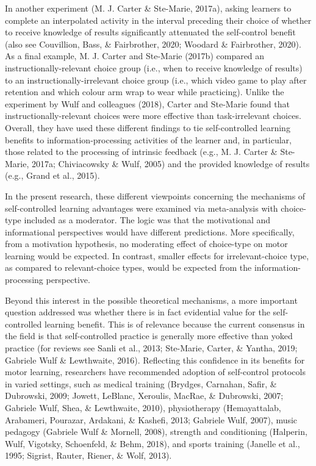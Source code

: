 \documentclass[
  english,
  man, donotrepeattitle,floatsintext]{apa7}
\begin{document}
In another experiment (M. J. Carter \& Ste-Marie, 2017a), asking learners to complete an interpolated activity in the interval preceding their choice of whether to receive knowledge of results significantly attenuated the self-control benefit (also see Couvillion, Bass, \& Fairbrother, 2020; Woodard \& Fairbrother, 2020). As a final example, M. J. Carter and Ste-Marie (2017b) compared an instructionally-relevant choice group (i.e., when to receive knowledge of results) to an instructionally-irrelevant choice group (i.e., which video game to play after retention and which colour arm wrap to wear while practicing). Unlike the experiment by Wulf and colleagues (2018), Carter and Ste-Marie found that instructionally-relevant choices were more effective than task-irrelevant choices. Overall, they have used these different findings to tie self-controlled learning benefits to information-processing activities of the learner and, in particular, those related to the processing of intrinsic feedback (e.g., M. J. Carter \& Ste-Marie, 2017a; Chiviacowsky \& Wulf, 2005) and the provided knowledge of results (e.g., Grand et al., 2015).

In the present research, these different viewpoints concerning the mechanisms of self-controlled learning advantages were examined via meta-analysis with choice-type included as a moderator. The logic was that the motivational and informational perspectives would have different predictions. More specifically, from a motivation hypothesis, no moderating effect of choice-type on motor learning would be expected. In contrast, smaller effects for irrelevant-choice type, as compared to relevant-choice types, would be expected from the information-processing perspective.

Beyond this interest in the possible theoretical mechanisms, a more important question addressed was whether there is in fact evidential value for the self-controlled learning benefit. This is of relevance because the current consensus in the field is that self-controlled practice is generally more effective than yoked practice (for reviews see Sanli et al., 2013; Ste-Marie, Carter, \& Yantha, 2019; Gabriele Wulf \& Lewthwaite, 2016). Reflecting this confidence in its benefits for motor learning, researchers have recommended adoption of self-control protocols in varied settings, such as medical training (Brydges, Carnahan, Safir, \& Dubrowski, 2009; Jowett, LeBlanc, Xeroulis, MacRae, \& Dubrowski, 2007; Gabriele Wulf, Shea, \& Lewthwaite, 2010), physiotherapy (Hemayattalab, Arabameri, Pourazar, Ardakani, \& Kashefi, 2013; Gabriele Wulf, 2007), music pedagogy (Gabriele Wulf \& Mornell, 2008), strength and conditioning (Halperin, Wulf, Vigotsky, Schoenfeld, \& Behm, 2018), and sports training (Janelle et al., 1995; Sigrist, Rauter, Riener, \& Wolf, 2013).
\end{document}
